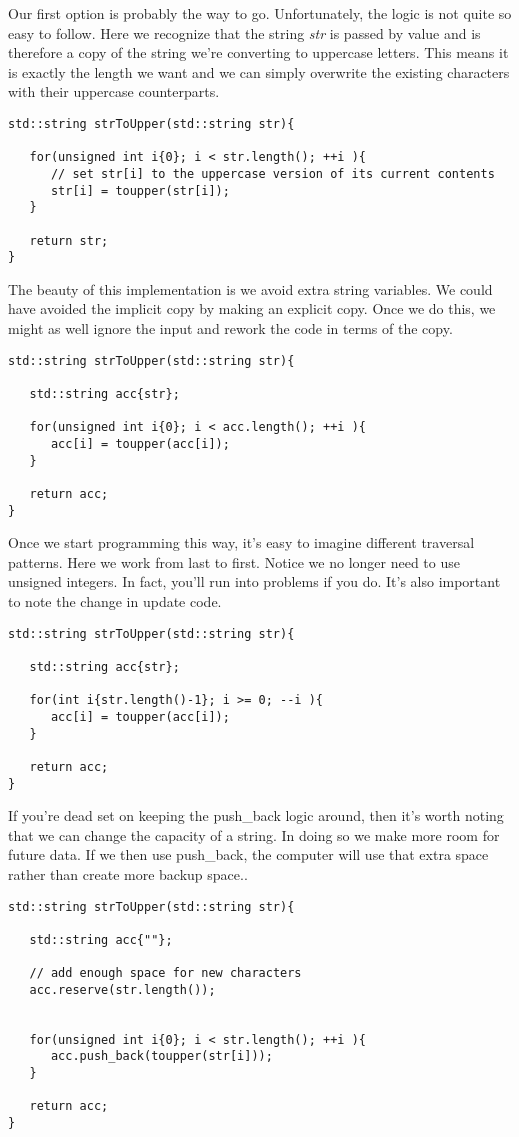 \documentclass[]{tufte-handout}
\begin{document}
Our first option is probably the way to go.  Unfortunately, the logic is not quite so easy to follow. Here we recognize that the string \textit{str} is passed by value and is therefore a copy of the string we're converting to uppercase letters.  This means it is exactly the length we want and we can simply overwrite the existing characters with their uppercase counterparts.   
\begin{verbatim}
std::string strToUpper(std::string str){
   
   for(unsigned int i{0}; i < str.length(); ++i ){
	  // set str[i] to the uppercase version of its current contents
      str[i] = toupper(str[i]);
   }
   
   return str;
}
\end{verbatim}
The beauty of this implementation is we avoid extra string variables. We could have avoided the implicit copy by making an explicit copy. Once we do this, we might as well ignore the input and rework the code in terms of the copy. 
\begin{verbatim}
std::string strToUpper(std::string str){
   
   std::string acc{str};
   	
   for(unsigned int i{0}; i < acc.length(); ++i ){
      acc[i] = toupper(acc[i]);
   }
   
   return acc;
}
\end{verbatim}

Once we start programming this way, it's easy to imagine different traversal patterns. Here we work from last to first. Notice we no longer need to use unsigned integers. In fact, you'll run into problems if you do. It's also important to note the change in update code.
\begin{verbatim}
std::string strToUpper(std::string str){
   
   std::string acc{str};
   	
   for(int i{str.length()-1}; i >= 0; --i ){
      acc[i] = toupper(acc[i]);
   }
   
   return acc;
}
\end{verbatim}


If you're dead set on keeping the push\_back logic around, then it's worth noting that we can change the capacity of a string. In doing so we make more room for future data.  If we then use push\_back, the computer will use that extra space rather than create more backup space..  
\begin{verbatim}
std::string strToUpper(std::string str){
   
   std::string acc{""};
   
   // add enough space for new characters
   acc.reserve(str.length());   
  
   
   for(unsigned int i{0}; i < str.length(); ++i ){
	  acc.push_back(toupper(str[i]));
   }
   
   return acc;
}
\end{verbatim}
\end{document}
